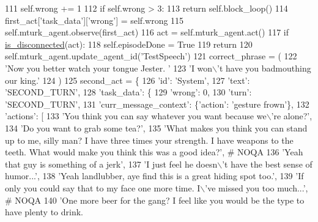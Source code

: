 \begin{DoxyCode}
111             self.wrong += 1
112             \textcolor{keywordflow}{if} self.wrong > 3:
113                 \textcolor{keywordflow}{return} self.block\_loop()
114             first\_act[\textcolor{stringliteral}{'task\_data'}][\textcolor{stringliteral}{'wrong'}] = self.wrong
115             self.mturk\_agent.observe(first\_act)
116             act = self.mturk\_agent.act()
117             \textcolor{keywordflow}{if} \hyperlink{namespacelight__chats_1_1worlds_a43b0aff73307cda95a089763b77f40d3}{is\_disconnected}(act):
118                 self.episodeDone = \textcolor{keyword}{True}
119                 \textcolor{keywordflow}{return}
120         self.mturk\_agent.update\_agent\_id(\textcolor{stringliteral}{'TestSpeech'})
121         correct\_phrase = (
122             \textcolor{stringliteral}{'Now you better watch your tongue Jester. '}
123             \textcolor{stringliteral}{'I won\(\backslash\)'t have you badmouthing our king.'}
124         )
125         second\_act = \{
126             \textcolor{stringliteral}{'id'}: \textcolor{stringliteral}{'System'},
127             \textcolor{stringliteral}{'text'}: \textcolor{stringliteral}{'SECOND\_TURN'},
128             \textcolor{stringliteral}{'task\_data'}: \{
129                 \textcolor{stringliteral}{'wrong'}: 0,
130                 \textcolor{stringliteral}{'turn'}: \textcolor{stringliteral}{'SECOND\_TURN'},
131                 \textcolor{stringliteral}{'curr\_message\_context'}: \{\textcolor{stringliteral}{'action'}: \textcolor{stringliteral}{'gesture frown'}\},
132                 \textcolor{stringliteral}{'actions'}: [
133                     \textcolor{stringliteral}{'You think you can say whatever you want because we\(\backslash\)'re alone?'},
134                     \textcolor{stringliteral}{'Do you want to grab some tea?'},
135                     \textcolor{stringliteral}{'What makes you think you can stand up to me, silly man? I have three times your
       strength. I have weapons to the teeth. What would make you think this was a good idea?'},  \textcolor{comment}{# NOQA}
136                     \textcolor{stringliteral}{'Yeah that guy is something of a jerk'},
137                     \textcolor{stringliteral}{'I just feel he doesn\(\backslash\)'t have the best sense of humor...'},
138                     \textcolor{stringliteral}{'Yeah landlubber, aye find this is a great hiding spot too.'},
139                     \textcolor{stringliteral}{'If only you could say that to my face one more time. I\(\backslash\)'ve missed you too much...'},  \textcolor{comment}{#
       NOQA}
140                     \textcolor{stringliteral}{'One more beer for the gang? I feel like you would be the type to have plenty to drink.
}
\end{DoxyCode}
